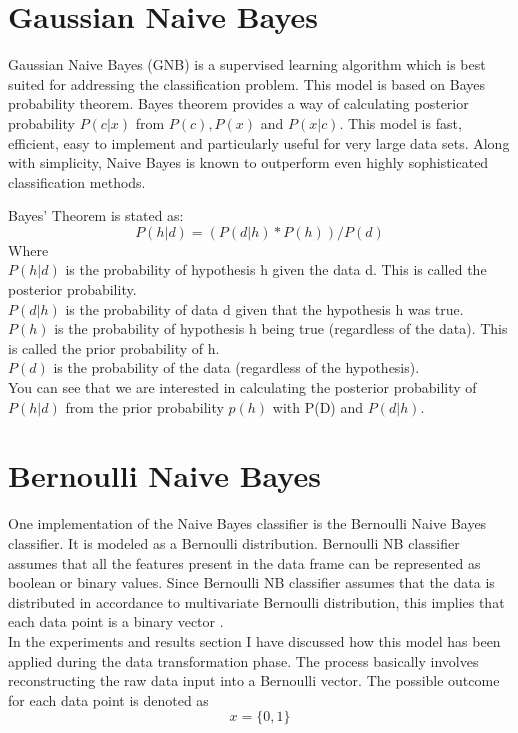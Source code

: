 \documentclass[12pt, letterpaper, titlepage]{report}
\begin{document}
\section{Gaussian Naive Bayes}
Gaussian Naive Bayes (GNB) is a supervised learning algorithm which is best suited for addressing the classification problem. This model is based on Bayes probability theorem. Bayes theorem provides a way of calculating posterior probability $P(c|x)$ from $P(c), P(x)$ and $P(x|c)$. This model is fast, efficient, easy to implement and particularly useful for very large data sets. Along with simplicity, Naive Bayes is known to outperform even highly sophisticated classification methods.

Bayes’ Theorem is stated as:
$$P(h|d) = (P(d|h) * P(h)) / P(d)$$
Where\\
$P(h|d)$ is the probability of hypothesis h given the data d. This is called the posterior probability.\\
$P(d|h)$ is the probability of data d given that the hypothesis h was true.\\
$P(h)$ is the probability of hypothesis h being true (regardless of the data). This is called the prior probability of h.\\
$P(d)$ is the probability of the data (regardless of the hypothesis).\\
You can see that we are interested in calculating the posterior probability of $P(h|d)$ from the prior probability $p(h)$ with P(D) and $P(d|h)$.


\section{Bernoulli Naive Bayes}
One implementation of the Naive Bayes classifier is the Bernoulli Naive Bayes classifier. It is modeled as a Bernoulli distribution. Bernoulli NB classifier assumes that all the features present in the data frame can be represented as boolean or binary values. Since Bernoulli NB classifier assumes that the data is distributed in accordance to multivariate Bernoulli distribution, this implies that each data point is a binary vector \citep{shimodaira2014text}.\\
In the experiments and results section I have discussed how this model has been applied during the data transformation phase. The process basically involves reconstructing the raw data input into a Bernoulli vector. The possible outcome for each data point is denoted as $$x = \{0,1\}$$\\ 
\end{document}
